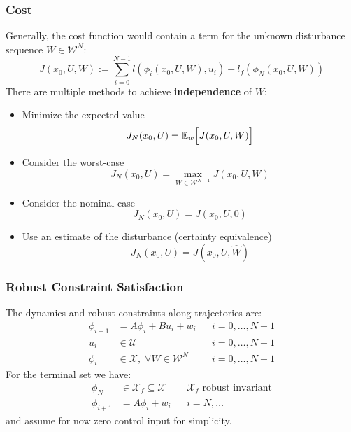\subsubsection{Cost}
Generally, the cost function would contain a term for the unknown disturbance sequence $W\in \mathcal{W}^{N}$:
\begin{equation*}
    J(x_0, U, W) := \sum_{i=0}^{N-1} l(\phi_i(x_0, U, W), u_i) + l_f(\phi_N(x_0, U, W))
\end{equation*}
\newpar{}
There are multiple methods to achieve \textbf{independence} of $W$:
\begin{itemize}
    \item Minimize the expected value
          \begin{equation*}
              J_N(x_0, U) = \mathbb{E}_w \Bigl[J(x_0, U, W)\Bigr]
          \end{equation*}
    \item Consider the worst-case
          \begin{equation*}
              J_N(x_0, U) = \max_{W\in \mathcal{W}^{N-1}} J(x_0, U, W)
          \end{equation*}
    \item Consider the nominal case
          \begin{equation*}
              J_N(x_0, U) = J(x_0, U, 0)
          \end{equation*}
    \item Use an estimate of the disturbance (certainty equivalence)
          \begin{equation*}
              J_N(x_0, U) = J(x_0, U, \widehat{W})
          \end{equation*}
\end{itemize}

\subsubsection{Robust Constraint Satisfaction}\label{ssec:robust_constraint_satisfaction}
The dynamics and robust constraints along trajectories are:
\begin{align*}
    \phi_{i+1} & = A\phi_{i} + Bu_{i} + w_{i}                  &  & i = 0,\ldots, N-1 \\
    u_i        & \in \mathcal{U}                               &  & i = 0,\ldots, N-1 \\
    \phi_{i}   & \in \mathcal{X},\; \forall W\in \mathcal{W}^N &  & i = 0,\ldots, N-1
\end{align*}
For the terminal set we have:
\begin{align*}
    \phi_{N}   & \in \mathcal{X}_f \subseteq \mathcal{X} &  & \mathcal{X}_f \text{ robust invariant} \\
    \phi_{i+1} & = A\phi_{i} + w_{i}                     &  & i = N, \ldots
\end{align*}
and assume for now zero control input for simplicity.
